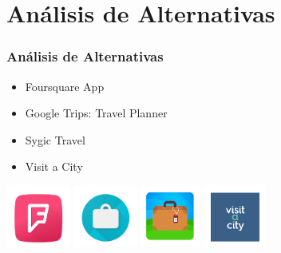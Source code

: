 \documentclass{beamer}
\begin{document}
\section{Análisis de Alternativas}
\begin{frame}
\frametitle{Análisis de Alternativas}

\begin{itemize}
 \item Foursquare App
 \item Google Trips: Travel Planner
 \item Sygic Travel
 \item Visit a City
\end{itemize}


\vspace{0.5cm}
\begin{center}
\includegraphics[height=2cm]{./img/FoursquareApp.png}
\includegraphics[height=2cm]{./img/GoogleTrips.png}
\includegraphics[height=2cm]{./img/SygicTravel.png}
\includegraphics[height=2cm]{./img/VisitaCity.png}

\end{center}
\end{frame}
\end{document}
